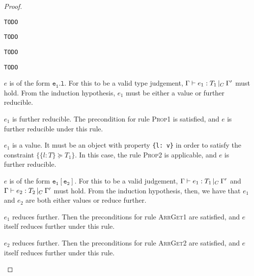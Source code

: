 \documentclass[a4paper]{article}
\theoremstyle{dotless}
\begin{document}
\begin{proof}
  \begin{case}[Fun2]\label{fun2}
	\texttt{TODO}
  \end{case}

  \begin{case}[Fun3]\label{fun3}
	\texttt{TODO}
  \end{case}

  \begin{case}[Fun4]\label{fun4}
	\texttt{TODO}
  \end{case}

  \begin{case}[IDType]\label{idtype}
	\texttt{TODO}
  \end{case}

  \begin{case}[PropType]\label{proptype}

	$e$ is of the form $\mathtt{e_1.l}$. For this to be a valid type
	judgement, $\Gamma{}\vdash e_1: T_1\,|_C\:\Gamma'$ must hold. From the induction
	hypothesis, $e_1$ must be either a value or further reducible.
	\begin{subcase}
	  $e_1$ is further reducible. The precondition for rule \textsc{Prop1} is
	  satisfied, and $e$ is further reducible under this rule.
  	\end{subcase}
  	\begin{subcase}
  	  $e_1$ is a value. It must be an object with property \texttt{\{l: v\}}
	  in order to satisfy the constraint $\{\{l:T\}\succeq T_1\}$. In this case, the rule
	  \textsc{Prop2} is applicable, and $e$ is further reducible.
  	\end{subcase}
  \end{case}

  \begin{case}[ArrayType]\label{arraytype}

	$e$ is of the form $\mathtt{e_1[e_2]}$. For this to be a valid
	judgement, $\Gamma{}\vdash e_1: T_1\,|_C\:\Gamma'$ and $\Gamma{}\vdash e_2: T_2\,|_C\:\Gamma'$ must hold. From
	the induction hypothesis, then, we have that $e_1$ and $e_2$ are both
	either values or reduce further.

	\begin{subcase}
	  $e_1$ reduces further. Then the preconditions for rule
	  \textsc{ArrGet1} are satisfied, and $e$ itself reduces further under
	  this rule.
	\end{subcase}

	\begin{subcase}
	  $e_2$ reduces further. Then the preconditions for rule
	  \textsc{ArrGet2} are satisfied, and $e$ itself reduces further under
	  this rule.
  	\end{subcase}


\end{case}
\end{proof}
\end{document}
